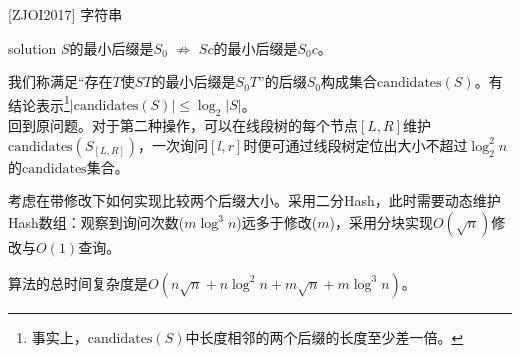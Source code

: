 \documentclass{beamer}
\theoremstyle{compact}
\def\le{\leqslant}
\begin{document}
\begin{frame}{[ZJOI2017] 字符串}
	\begin{block}{solution}
		$S$的最小后缀是$S_0$ $\not\Rightarrow$ $Sc$的最小后缀是$S_0c$。

		我们称满足“存在$T$使$ST$的最小后缀是$S_0T$”的后缀$S_0$构成集合$\textrm{candidates}(S)$。有结论表示\footnote{\tiny 事实上，$\textrm{candidates}(S)$中长度相邻的两个后缀的长度至少差一倍。}$|\textrm{candidates}(S)| \le \log_2 |S|$。\pause\\

		回到原问题。对于第二种操作，可以在线段树的每个节点$[L, R]$维护$\textrm{candidates}(S_{[L, R]})$，一次询问$[l, r]$时便可通过线段树定位出大小不超过$\log_2^2 n$的$\textrm{candidates}$集合。

		考虑在带修改下如何实现比较两个后缀大小。采用二分Hash，此时需要动态维护Hash数组：观察到询问次数($m \log^3n$)远多于修改($m$)，采用分块实现$O(\sqrt n)$修改与$O(1)$查询。

		算法的总时间复杂度是$O(n\sqrt n + n\log^2n + m\sqrt n + m\log^3n)$。
	\end{block}
\end{frame}
\end{document}
